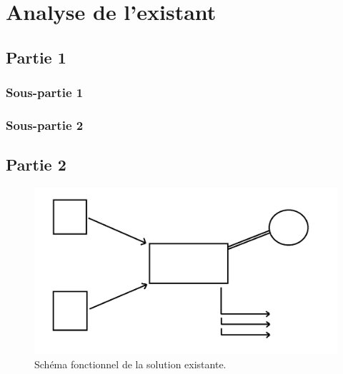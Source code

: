\section{Analyse de l'existant}
\label{chap:analyse_existant}

\subsection{Partie 1}
\label{sec:existant_partie1}
\subsubsection{Sous-partie 1}
\label{ssec:existant_partie1_sous1}

\subsubsection{Sous-partie 2}
\label{ssec:existant_partie1_sous2}

\subsection{Partie 2}
\label{sec:existant_partie2}

\begin{figure}[h!]
    \centering
    \includegraphics[width=0.8\linewidth]{figs/schema.png}
    \caption{Schéma fonctionnel de la solution existante.}
    \label{fig:schema_existant}
\end{figure}

